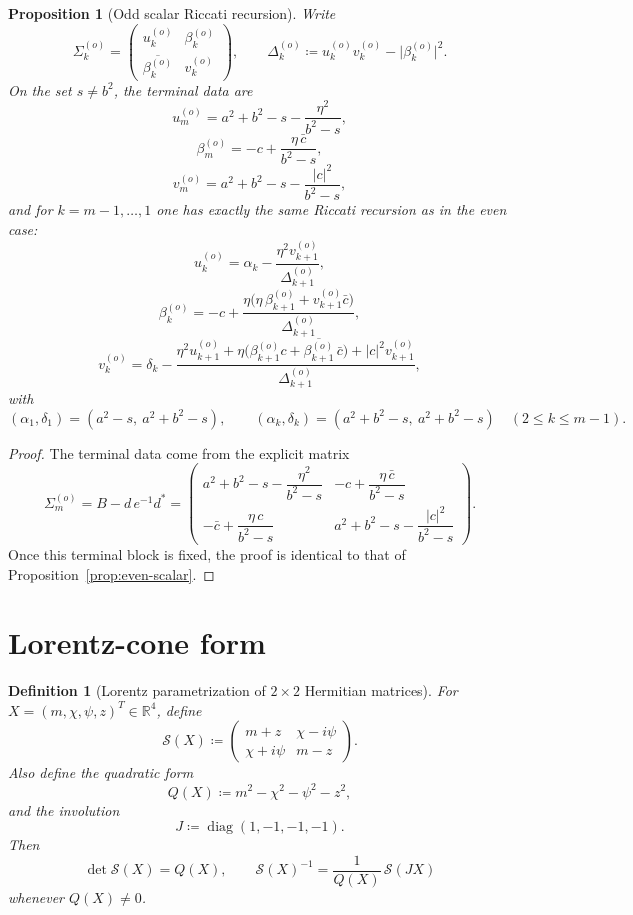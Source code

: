 \documentclass[11pt]{article}
\newtheorem{proposition}[lemma]{Proposition}
\newtheorem{definition}[lemma]{Definition}
\newcommand{\R}{\mathbb R}
\begin{document}
\begin{proposition}[Odd scalar Riccati recursion]\label{prop:odd-scalar}
Write
\[
\Sigma_k^{(o)}=
\begin{pmatrix}
u_k^{(o)} & \beta_k^{(o)}\\
\overline{\beta_k^{(o)}} & v_k^{(o)}
\end{pmatrix},
\qquad
\Delta_k^{(o)}\coloneqq
u_k^{(o)}v_k^{(o)}-\bigl|\beta_k^{(o)}\bigr|^2.
\]
On the set \(s\neq b^2\), the terminal data are
\[
u_m^{(o)}
=
a^2+b^2-s-\frac{\eta^2}{b^2-s},
\]
\[
\beta_m^{(o)}
=
-c+\frac{\eta\,\bar c}{b^2-s},
\]
\[
v_m^{(o)}
=
a^2+b^2-s-\frac{|c|^2}{b^2-s},
\]
and for \(k=m-1,\dots,1\) one has exactly the same Riccati recursion as in the even case:
\[
u_k^{(o)}
=
\alpha_k-\frac{\eta^2 v_{k+1}^{(o)}}{\Delta_{k+1}^{(o)}},
\]
\[
\beta_k^{(o)}
=
-c+\frac{\eta\bigl(\eta\,\beta_{k+1}^{(o)}+v_{k+1}^{(o)}\bar c\bigr)}
{\Delta_{k+1}^{(o)}},
\]
\[
v_k^{(o)}
=
\delta_k-\frac{
\eta^2 u_{k+1}^{(o)}
+\eta\bigl(\beta_{k+1}^{(o)}c+\overline{\beta_{k+1}^{(o)}}\,\bar c\bigr)
+|c|^2 v_{k+1}^{(o)}
}{\Delta_{k+1}^{(o)}},
\]
with
\[
(\alpha_1,\delta_1)=(a^2-s,\ a^2+b^2-s),
\qquad
(\alpha_k,\delta_k)=(a^2+b^2-s,\ a^2+b^2-s)
\quad (2\le k\le m-1).
\]
\end{proposition}

\begin{proof}
The terminal data come from the explicit matrix
\[
\Sigma_m^{(o)}=B-d\,e^{-1}d^*
=
\begin{pmatrix}
a^2+b^2-s-\dfrac{\eta^2}{b^2-s}
&
-c+\dfrac{\eta\,\bar c}{b^2-s}\\[2ex]
-\bar c+\dfrac{\eta\,c}{b^2-s}
&
a^2+b^2-s-\dfrac{|c|^2}{b^2-s}
\end{pmatrix}.
\]
Once this terminal block is fixed, the proof is identical to that of
Proposition~\ref{prop:even-scalar}.
\end{proof}

\section{Lorentz-cone form}

\begin{definition}[Lorentz parametrization of \(2\times 2\) Hermitian matrices]
For \(X=(m,\chi,\psi,z)^T\in\R^4\), define
\[
\mathscr S(X)\coloneqq
\begin{pmatrix}
m+z & \chi-i\psi\\
\chi+i\psi & m-z
\end{pmatrix}.
\]
Also define the quadratic form
\[
Q(X)\coloneqq m^2-\chi^2-\psi^2-z^2,
\]
and the involution
\[
J\coloneqq \operatorname{diag}(1,-1,-1,-1).
\]
Then
\[
\det \mathscr S(X)=Q(X),
\qquad
\mathscr S(X)^{-1}=\frac{1}{Q(X)}\,\mathscr S(JX)
\]
whenever \(Q(X)\neq 0\).
\end{definition}
\end{document}
